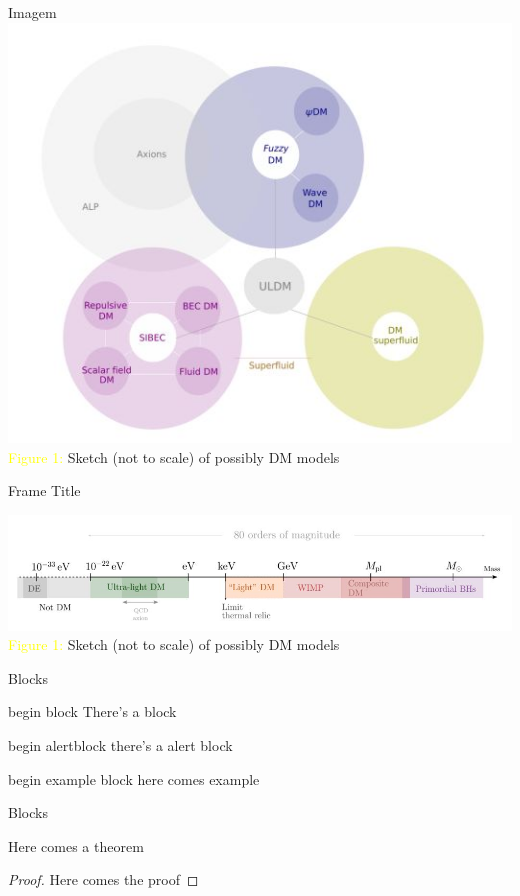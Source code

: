 \begin{frame}{Imagem}
    \centering
        \includegraphics[width = 0.6
        \textwidth]{images/classes_ULDM.jpg}\\
        \footnotesize \textcolor{yellow}{Figure 1:} Sketch (not to scale) of possibly DM models
\end{frame}

\begin{frame}{Frame Title}

        \centering
        \includegraphics[width = 1\textwidth]{images/DM_particles.jpg}\\
        \footnotesize \textcolor{yellow}{Figure 1:} Sketch (not to scale) of possibly DM models
    \end{frame}
    
 \frame{\sectionpage}



\begin{frame}{Blocks}
\begin{block}{begin block}
There's a block
\end{block}

\begin{alertblock}{begin alertblock}
    there's a alert block 
\end{alertblock}

\begin{exampleblock}{begin example block}
here comes example
\end{exampleblock} 

\end{frame}


\begin{frame}{Blocks}
    
\begin{theorem}
    Here comes a theorem
\end{theorem}

\begin{proof}
    Here comes the proof
\end{proof}


    
\end{frame}